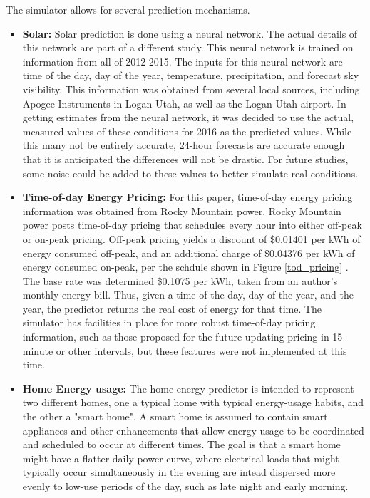 The simulator allows for several prediction mechanisms.

\begin{itemize}
  \item \textbf{Solar:} Solar prediction is done using a neural network. The actual details of this network are part of a different study. This neural network is trained on information from all of 2012-2015. The inputs for this neural network are time of the day, day of the year, temperature, precipitation, and forecast sky visibility. This information was obtained from several local sources, including Apogee Instruments in Logan Utah, as well as the Logan Utah airport. In getting estimates from the neural network, it was decided to use the actual, measured values of these conditions for 2016 as the predicted values. While this many not be entirely accurate, 24-hour forecasts are accurate enough that it is anticipated the differences will not be drastic. For future studies, some noise could be added to these values to better simulate real conditions.
  \item \textbf{Time-of-day Energy Pricing:} For this paper, time-of-day energy pricing information was obtained from Rocky Mountain power. Rocky Mountain power posts time-of-day pricing that schedules every hour into either off-peak or on-peak pricing. Off-peak pricing yields a discount of \$0.01401 per kWh of energy consumed off-peak, and an additional charge of \$0.04376 per kWh of energy consumed on-peak, per the schdule shown in Figure \ref{tod_pricing} . The base rate was determined \$0.1075 per kWh, taken from an author's monthly energy bill. Thus, given a time of the day, day of the year, and the year, the predictor returns the real cost of energy for that time. The simulator has facilities in place for more robust time-of-day pricing information, such as those proposed for the future updating pricing in 15-minute or other intervals, but these features were not implemented at this time.
  \item \textbf{Home Energy usage:} The home energy predictor is intended to represent two different homes, one a typical home with typical energy-usage habits, and the other a "smart home". A smart home is assumed to contain smart appliances and other enhancements that allow energy usage to be coordinated and scheduled to occur at different times. The goal is that a smart home might have a flatter daily power curve, where electrical loads that might typically occur simultaneously in the evening are intead dispersed more evenly to low-use periods of the day, such as late night and early morning.


\end{itemize}
